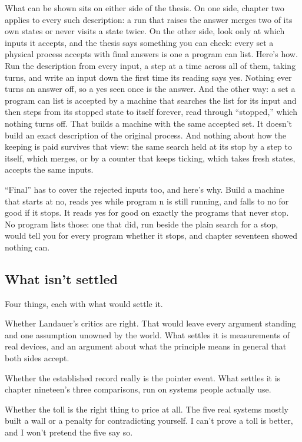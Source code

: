 \documentclass[11pt,twoside]{article}
\theoremstyle{thielethm}
\theoremstyle{thieledef}
\theoremstyle{thieledef}
\theoremstyle{thieledef}
\theoremstyle{thielethm}
\theoremstyle{thieleobs}
\theoremstyle{thielethm}
\begin{document}
What can be shown sits on either side of the thesis. On one side, chapter two applies to every such description: a run that raises the answer merges two of its own states or never visits a state twice. On the other side, look only at which inputs it accepts, and the thesis says something you can check: every set a physical process accepts with final answers is one a program can list. Here's how. Run the description from every input, a step at a time across all of them, taking turns, and write an input down the first time its reading says yes. Nothing ever turns an answer off, so a yes seen once is the answer. And the other way: a set a program can list is accepted by a machine that searches the list for its input and then steps from its stopped state to itself forever, read through ``stopped,'' which nothing turns off. That builds a machine with the same accepted set. It doesn't build an exact description of the original process. And nothing about how the keeping is paid survives that view: the same search held at its stop by a step to itself, which merges, or by a counter that keeps ticking, which takes fresh states, accepts the same inputs.

``Final'' has to cover the rejected inputs too, and here's why. Build a machine that starts at no, reads yes while program n is still running, and falls to no for good if it stops. It reads yes for good on exactly the programs that never stop. No program lists those: one that did, run beside the plain search for a stop, would tell you for every program whether it stops, and chapter seventeen showed nothing can.

\subsection{What isn't settled}

Four things, each with what would settle it.

Whether Landauer's critics are right. That would leave every argument standing and one assumption unowned by the world. What settles it is measurements of real devices, and an argument about what the principle means in general that both sides accept.

Whether the established record really is the pointer event. What settles it is chapter nineteen's three comparisons, run on systems people actually use.

Whether the toll is the right thing to price at all. The five real systems mostly built a wall or a penalty for contradicting yourself. I can't prove a toll is better, and I won't pretend the five say so.
\end{document}
